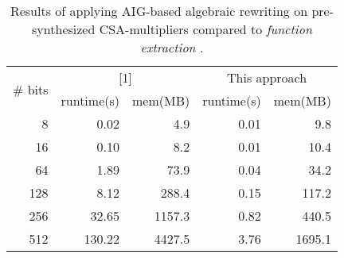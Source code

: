 \begin{table}[t]
\centering
\caption{Results of applying AIG-based algebraic rewriting on pre-synthesized CSA-multipliers compared to \textit{function extraction} \cite{ciesielski2015verification}.}
\vspace{-1mm}
\label{tbl:pre}
\begin{tabular}{|r|r|r|r|r|}
\hline
\multirow{2}{*}{\# bits} & \multicolumn{2}{c|}{{[}1{]}} & \multicolumn{2}{c|}{This approach} \\ \cline{2-5} 
 & runtime(s) & mem(MB) & runtime(s) & mem(MB) \\ \hline
8 & 0.02 & 4.9 & 0.01 & 9.8 \\ \hline
16 & 0.10 & 8.2 & 0.01 & 10.4 \\ \hline
64 & 1.89 & 73.9 & 0.04 & 34.2 \\ \hline
128 & 8.12 & 288.4 & 0.15 & 117.2 \\ \hline
256 & 32.65 & 1157.3 & 0.82 & 440.5 \\ \hline
512 & 130.22 & 4427.5 & 3.76 & 1695.1 \\ \hline
\end{tabular}
\end{table}
